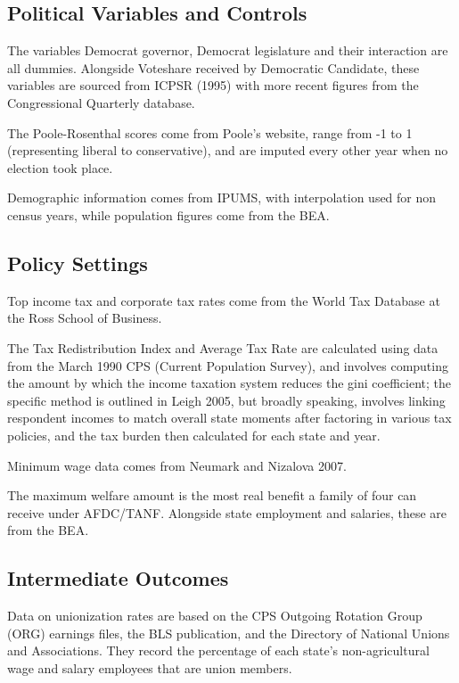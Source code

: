 \documentclass{article}
\begin{document}
\subsection{Political Variables and Controls}

The variables Democrat governor, Democrat legislature and their interaction are all dummies. Alongside Voteshare received by Democratic Candidate, these variables are sourced from ICPSR (1995) with more recent figures from the Congressional Quarterly database. 

The Poole-Rosenthal scores come from Poole's website, range from -1 to 1 (representing liberal to conservative), and are imputed every other year when no election took place.

Demographic information comes from IPUMS, with interpolation used for non census years, while population figures come from the BEA.


\subsection{Policy Settings}

Top income tax and corporate tax rates come from the World Tax Database at the Ross School of Business.

The Tax Redistribution Index and Average Tax Rate are calculated using data from the March 1990 CPS (Current Population Survey), and involves computing the amount by which the income taxation system reduces the gini coefficient; the specific method is outlined in Leigh 2005, but broadly speaking, involves linking respondent incomes to match overall state moments after factoring in various tax policies, and the tax burden then calculated for each state and year. 

Minimum wage data comes from Neumark and Nizalova 2007.

The maximum welfare amount is the most real benefit a family of four can receive under AFDC/TANF. Alongside state employment and salaries, these are from the BEA.

\subsection{Intermediate Outcomes}

Data on unionization rates are based on the CPS Outgoing Rotation Group (ORG) earnings files, the BLS publication, and the Directory of National Unions and Associations. They record the percentage of each state's non-agricultural wage and salary employees that are union members.
\end{document}
